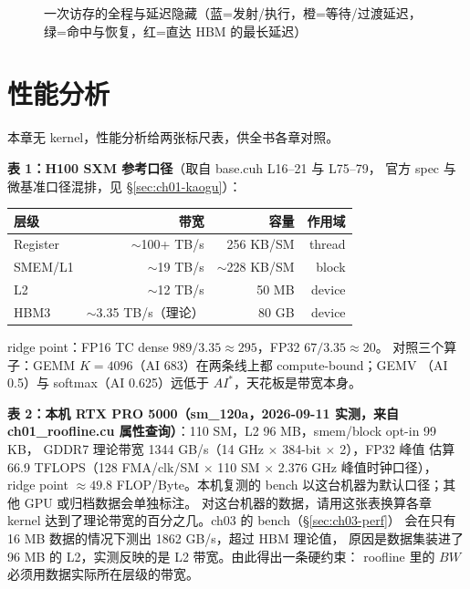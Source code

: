 \begin{figure}[htbp]
\caption{一次访存的全程与延迟隐藏（蓝=发射/执行，橙=等待/过渡延迟，绿=命中与恢复，红=直达 HBM 的最长延迟）}
\label{fig:1-3}
\end{figure}

\section{性能分析}\label{sec:ch01-perf}

本章无 kernel，性能分析给两张标尺表，供全书各章对照。

\textbf{表 1：H100 SXM 参考口径}（取自 base.cuh L16--21 与 L75--79，
官方 spec 与微基准口径混排，见 \S\ref{sec:ch01-kaogu}）：

\begin{center}
\begin{tabular}{lrrr}
\toprule
层级 & 带宽 & 容量 & 作用域 \\
\midrule
Register & $\sim$100+ TB/s & 256 KB/SM & thread \\
SMEM/L1 & $\sim$19 TB/s & $\sim$228 KB/SM & block \\
L2 & $\sim$12 TB/s & 50 MB & device \\
HBM3 & $\sim$3.35 TB/s（理论） & 80 GB & device \\
\bottomrule
\end{tabular}
\end{center}

ridge point：FP16 TC dense $989/3.35 \approx 295$，FP32 $67/3.35 \approx 20$。
对照三个算子：GEMM $K{=}4096$（AI 683）在两条线上都 compute-bound；GEMV
（AI 0.5）与 softmax（AI 0.625）远低于 $AI^{*}$，天花板是带宽本身。

\textbf{表 2：本机 RTX PRO 5000（sm\_120a，2026-09-11 实测，来自
ch01\_roofline.cu 属性查询）}：110 SM，L2 96 MB，smem/block opt-in 99 KB，
GDDR7 理论带宽 1344 GB/s（14 GHz $\times$ 384-bit $\times$ 2），FP32 峰值
估算 66.9 TFLOPS（128 FMA/clk/SM $\times$ 110 SM $\times$ 2.376 GHz 峰值时钟口径），
ridge point $\approx 49.8$
FLOP/Byte。本机复测的 bench 以这台机器为默认口径；其他 GPU 或归档数据会单独标注。
对这台机器的数据，请用这张表换算各章 kernel 达到了理论带宽的百分之几。ch03 的 bench（\S\ref{sec:ch03-perf}）
会在只有 16 MB 数据的情况下测出 1862 GB/s，超过 HBM 理论值，
原因是数据集装进了 96 MB 的 L2，实测反映的是 L2 带宽。由此得出一条硬约束：
roofline 里的 $BW$ 必须用数据实际所在层级的带宽。

